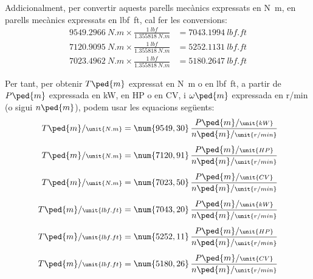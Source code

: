 Addicionalment, per  convertir aquests parells mecànics expressats en \unit{N.m}, en parells mecànics expressats en \unit{lbf.ft}, cal  fer les conversions:
\begin{subequations}
\begin{align}
    \qty{9549,2966}{N.m} \times \frac{\qty{1}{lbf}}{\qty{1,355818}{N.m}} &= \qty{7043,1994}{lbf.ft} \\[1ex]
    \qty{7120,9095}{N.m} \times \frac{\qty{1}{lbf}}{\qty{1,355818}{N.m}} &= \qty{5252,1131}{lbf.ft} \\[1ex]
    \qty{7023,4962}{N.m} \times \frac{\qty{1}{lbf}}{\qty{1,355818}{N.m}} &= \qty{5180,2647}{lbf.ft}
\end{align}
\end{subequations}

Per tant, per  obtenir $T\ped{m}$ expressat en \unit{N.m} o en \unit{lbf.ft}, a partir de $P\ped{m}$ expressada en kW, en HP o en CV, i $\omega\ped{m}$ expressada en \unit{r/min} (o sigui $n\ped{m}$),  podem usar les equacions següents:
\begin{subequations}
\begin{align}
    T\ped{m}/{\scriptstyle \unit{N.m}} &= \num{9549,30}\,  \frac{P\ped{m}/{\scriptstyle \unit{kW}}}{n\ped{m}/{\scriptstyle \unit{r/min}}} \\[1ex]
    T\ped{m}/{\scriptstyle \unit{N.m}} &= \num{7120,91}\,  \frac{P\ped{m}/{\scriptstyle \unit{HP}}}{n\ped{m}/{\scriptstyle \unit{r/min}}}\label{eq:T-N-m} \\[1ex]
    T\ped{m}/{\scriptstyle \unit{N.m}} &= \num{7023,50}\,  \frac{P\ped{m}/{\scriptstyle \unit{CV}}}{n\ped{m}/{\scriptstyle \unit{r/min}}} \\[1ex]
    T\ped{m}/{\scriptstyle \unit{lbf.ft}} &= \num{7043,20}\,  \frac{P\ped{m}/{\scriptstyle \unit{kW}}}{n\ped{m}/{\scriptstyle \unit{r/min}}} \\[1ex]
    T\ped{m}/{\scriptstyle \unit{lbf.ft}} &= \num{5252,11}\,  \frac{P\ped{m}/{\scriptstyle \unit{HP}}}{n\ped{m}/{\scriptstyle \unit{r/min}}}\label{eq:T-lbf-ft} \\[1ex]
    T\ped{m}/{\scriptstyle \unit{lbf.ft}} &= \num{5180,26}\,  \frac{P\ped{m}/{\scriptstyle \unit{CV}}}{n\ped{m}/{\scriptstyle \unit{r/min}}}
\end{align}
\end{subequations}

